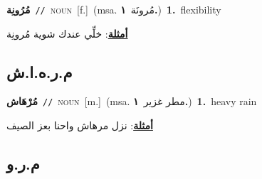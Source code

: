 \documentclass[10pt,a4paper,twoside]{article} %
\begin{document}
\begin{multicols}{2}
{\setlength\topsep{0pt}\textbf{\foreignlanguage{arabic}{مُرُونِة}}\ {\color{gray}\texttt{//}\color{black}}\ \textsc{noun}\ [f.]\ \color{gray}(msa. \foreignlanguage{arabic}{مُرونَة}~\foreignlanguage{arabic}{\textbf{١.}})\color{black}\ \textbf{1.}~flexibility\  \begin{flushright}\color{gray}\foreignlanguage{arabic}{\textbf{\underline{\foreignlanguage{arabic}{أمثلة}}}: خلِّي عندك شوية مُرونِة}\end{flushright}\color{black}} \vspace{2mm}

\vspace{-3mm}
\subsection*{\color{blue}\foreignlanguage{arabic}{م.ر.ه.ا.ش}\color{blue}{ (ntws)}} 

{\setlength\topsep{0pt}\textbf{\foreignlanguage{arabic}{مُرْهَاش}}\ {\color{gray}\texttt{//}\color{black}}\ \textsc{noun}\ [m.]\ \color{gray}(msa. \foreignlanguage{arabic}{مطر غزير}~\foreignlanguage{arabic}{\textbf{١.}})\color{black}\ \textbf{1.}~heavy rain\  \begin{flushright}\color{gray}\foreignlanguage{arabic}{\textbf{\underline{\foreignlanguage{arabic}{أمثلة}}}: نزل مرهاش واحنا بعز الصيف}\end{flushright}\color{black}} \vspace{2mm}

\vspace{-3mm}
\subsection*{\color{blue}\foreignlanguage{arabic}{م.ر.و}\color{blue}{}} 


\end{multicols}
\end{document}
